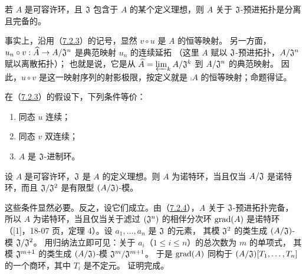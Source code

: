 若 $A$ 是可容许环，且 $\mathfrak J$ 包含于 $A$ 的某个定义理想，则 $A$ 关于
$\mathfrak J$-预进拓扑是分离且完备的。

事实上，沿用（\hyperlink{para:0:7.2.3}{7.2.3}）的记号，显然 $v\circ u$ 是 $A$ 的恒等映射。
另一方面，$u_n\circ v:\widehat{A}\to A/\mathfrak J^n$ 是典范映射 $u_n$ 的连续延拓
（这里 $A$ 赋以 $\mathfrak J$-预进拓扑，$A/\mathfrak J^n$ 赋以离散拓扑）；
也就是说，它是从 $\widehat{A}=\varprojlim_k A/\mathfrak J^k$ 到 $A/\mathfrak J^n$ 的典范映射。
因此，$u\circ v$ 是这一映射序列的射影极限，按定义就是 $\comp A$ 的恒等映射；命题得证。

在（\hyperlink{para:0:7.2.3}{7.2.3}）的假设下，下列条件等价：
\begin{enumerate}[label=\alph*)]
\item 同态 $u$ 连续；
\item 同态 $v$ 双连续；
\item $A$ 是 $\mathfrak J$-进制环。
\end{enumerate}

设 $A$ 是可容许环，$\mathfrak J$ 是 $A$ 的定义理想。则 $A$ 为诺特环，当且仅当
$A/\mathfrak J$ 是诺特环，而且 $\mathfrak J/\mathfrak J^2$ 是有限型 $(A/\mathfrak J)$-模。

这些条件显然必要。反之，设它们成立。由（\hyperlink{para:0:7.2.4}{7.2.4}），$A$ 关于 $\mathfrak J$-预进拓扑完备，
所以 $A$ 为诺特环，当且仅当关于滤过 $(\mathfrak J^n)$ 的相伴分次环 $\operatorname{grad}(A)$ 是诺特环
（[1]，18-07 页，定理 4）。设 $a_1,\ldots,a_n$ 是 $\mathfrak J$ 的元素，
其模 $\mathfrak J^2$ 的类生成 $(A/\mathfrak J)$-模 $\mathfrak J/\mathfrak J^2$。
用归纳法立即可见：关于 $a_i$（$1\leq i\leq n$）的总次数为 $m$ 的单项式，
其模 $\mathfrak J^{m+1}$ 的类生成 $(A/\mathfrak J)$-模 $\mathfrak J^m/\mathfrak J^{m+1}$。
于是 $\operatorname{grad}(A)$ 同构于 $(A/\mathfrak J)[T_1,\ldots,T_n]$ 的一个商环，其中 $T_i$ 是不定元。
证明完成。

